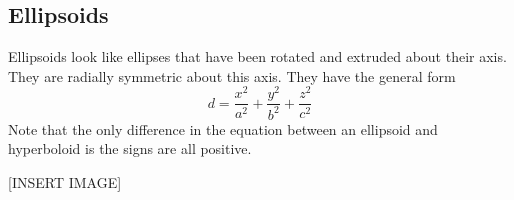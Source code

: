 \subsection{Ellipsoids}
\noindent
Ellipsoids look like ellipses that have been rotated and extruded about their axis. They are radially symmetric about this axis. They have the general form 
\begin{equation*}
	d = \frac{x^2}{a^2} + \frac{y^2}{b^2} + \frac{z^2}{c^2}	
\end{equation*}
Note that the only difference in the equation between an ellipsoid and hyperboloid is the signs are all positive.

[INSERT IMAGE]